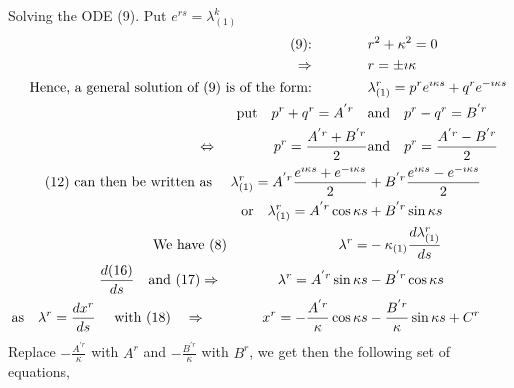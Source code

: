 Solving the ODE (9). Put $ e^{rs} = \lambda_{(1)}^k$
\begin{align}
\text{(9):}\quad\quad\quad\quad&  r^2 + \kappa^2 = 0\\
\Rightarrow \quad\quad\quad\quad & r = \pm \imath \kappa\\
\text{Hence, a general solution of (9) is of the form:} \quad\quad\quad\quad & \lambda_{(1)}^r = p^r e^{ \imath \kappa s}  + q^r e^{ -\imath \kappa s}\\
\text{put}\quad  p^r+q^r = A^{'r}\quad &\text{and}\quad p^r-q^r = B^{'r}\\
\Leftrightarrow \quad\quad\quad\quad p^r = \frac{A^{'r}+B^{'r}}{2} &\text{and}\quad p^r=\frac{A^{'r}-B^{'r}}{2}\\
\text{(12) can then be written as }\quad  \lambda_{(1)}^r = A^{'r}\frac{ e^{ \imath \kappa s}+  e^{ -\imath \kappa s}}{2} & + B^{'r}\frac{ e^{ \imath \kappa s}- e^{ -\imath \kappa s}}{2}\\
\text{or}\quad  \lambda_{(1)}^r = A^{'r}\cos \kappa s & + B^{'r}\sin \kappa s\\
\text{We have (8)}\quad\quad\quad\quad \quad\quad\quad\quad  \lambda^r =  & -  \kappa_{(1)} \dv{\lambda_{(1)}^r}{ s} \\
\dv{(16)}{s}\quad\text{and (17)}\Rightarrow\quad\quad\quad\quad \lambda^r =  A^{'r}\sin \kappa s & - B^{'r}\cos \kappa s\\
\text{as}\quad \lambda^r = \dv{x^r}{s}\quad\text{ with (18)}\quad \Rightarrow \quad\quad\quad\quad x^r = - \frac{A^{'r}}{\kappa}\cos \kappa s &  - \frac{B^{'r}}{\kappa}\sin \kappa s + C^r
\end{align}
Replace $- \frac{A^{'r}}{\kappa}$ with $A^{r}$ and $- \frac{B^{'r}}{\kappa}$ with $B^{r}$, we get then the following set of equations,

